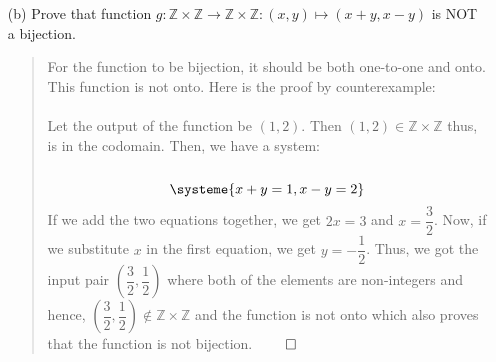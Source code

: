 \documentclass[12pt, a4paper]{article}
\newcommand{\ints}{\mathbb{Z}}
\begin{document}
\begin{itemize}
\item[]

\item[(b)]
Prove that function $g : \ints \times \ints \rightarrow \ints \times \ints : (x, y) \mapsto (x + y, x - y)$ is NOT a bijection.
\begin{quote}
For the function to be bijection, it should be both one-to-one and onto. This function is not onto. Here is the proof by counterexample:\\\\
Let the output of the function be $(1, 2)$. Then $(1, 2) \in \ints \times \ints$ thus, is in the codomain. Then, we have a system:\\\\
\begin{equation*}
    \systeme{
    x + y = 1,
    x - y = 2
    }
\end{equation*}
If we add the two equations together, we get $2x = 3$ and $x = \dfrac{3}{2}$. Now, if we substitute $x$
in the first equation, we get $y = -\dfrac{1}{2}$. Thus, we got the input pair $(\dfrac{3}{2}, \dfrac{1}{2})$
where both of the elements are non-integers and hence, $(\dfrac{3}{2}, \dfrac{1}{2}) \notin \ints \times \ints$
and the function is not onto which also proves that the function is not bijection.
$\qed$
\end{quote}

\item[]
\item[]


\end{itemize}
\end{document}
